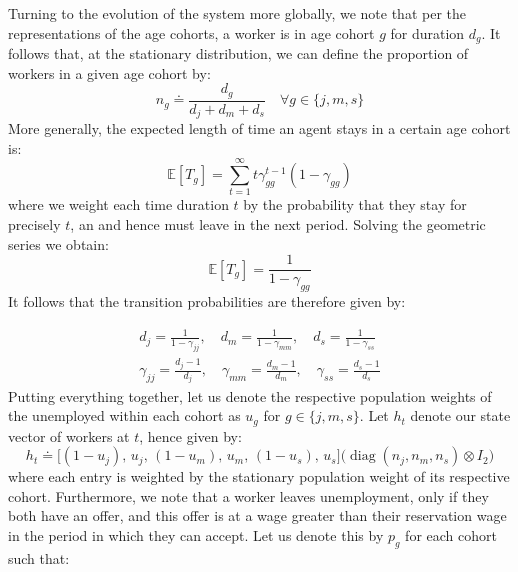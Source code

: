 \documentclass{article}
\begin{document}
Turning to the evolution of the system more globally, we note that per the representations of the age cohorts, a worker is in age cohort $g$ for duration $d_g$. It follows that, at the stationary distribution, we can define the proportion of workers in a given age cohort by:
\[
n_g\doteq\frac{d_g}{d_j+d_m+d_s}\quad\forall g\in\{j,m,s\}
\]
More generally, the expected length of time an agent stays in a certain age cohort is:
\[
\mathbb{E}[T_g]=\sum^\infty_{t=1}t\gamma_{gg}^{t-1}(1-\gamma_{gg})
\]
where we weight each time duration $t$ by the probability that they stay for precisely $t$, an and hence must leave in the next period. Solving the geometric series we obtain:
\[
\mathbb{E}[T_g]=\frac{1}{1-\gamma_{gg}}
\]
It follows that the transition probabilities are therefore given by:

\begin{align*}
d_j=\frac{1}{1-\gamma_{jj}},\quad 
d_m=\frac{1}{1-\gamma_{mm}},\quad 
d_s=\frac{1}{1-\gamma_{ss}}\\
\gamma_{jj}=\frac{d_j-1}{d_j},\quad
\gamma_{mm}=\frac{d_m-1}{d_m},\quad
\gamma_{ss}=\frac{d_s-1}{d_s}
\end{align*}
Putting everything together, let us denote the respective population weights of the unemployed within each cohort as $u_g$ for $g\in\{j,m,s\}$. Let $h_t$ denote our state vector of workers at $t$, hence given by:
\[
h_t \doteq
\bigl[(1-u_j),\, u_j,\, (1-u_m),\, u_m,\, (1-u_s),\, u_s\bigr]
\bigl(\operatorname{diag}(n_j,n_m,n_s)\otimes I_2\bigr)
\]
where each entry is weighted by the stationary population weight of its respective cohort. Furthermore, we note that a worker leaves unemployment, only if they both have an offer, and this offer is at a wage greater than their reservation wage in the period in which they can accept. Let us denote this by $p_g$ for each cohort such that:
\end{document}
